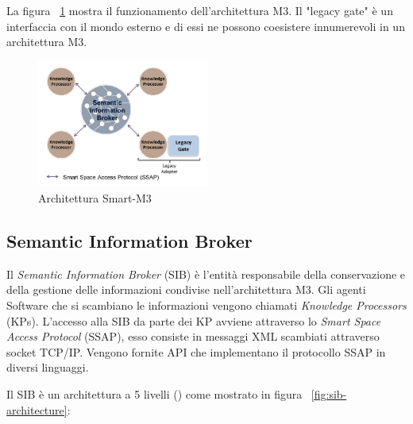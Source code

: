 La figura ~\ref{fig:smart-m3} mostra il funzionamento dell'architettura M3. Il "legacy gate" è un interfaccia con il mondo esterno e di essi ne possono coesistere innumerevoli in un architettura M3.

\begin{figure}[H]
	\centering
	\includegraphics[width=0.5\textwidth]{assets/smart-m3.jpg}
	\caption{Architettura Smart-M3}
	\label{fig:smart-m3}
\end{figure}

\subsection{Semantic Information Broker}\label{subsec:sib}

Il \emph{Semantic Information Broker} (SIB) è l'entità responsabile della conservazione e della gestione delle informazioni condivise nell'architettura M3. Gli agenti Software che si scambiano le informazioni vengono chiamati \emph{Knowledge Processors} (KPs). L'accesso alla SIB da parte dei KP avviene attraverso lo \emph{Smart Space Access Protocol}  (SSAP), esso consiste in messaggi XML scambiati attraverso socket TCP/IP. Vengono fornite API che implementano il protocollo SSAP in diversi linguaggi.

Il SIB è un architettura a 5 livelli (\cite{smart2010}) come mostrato in figura ~\ref{fig:sib-architecture}:

